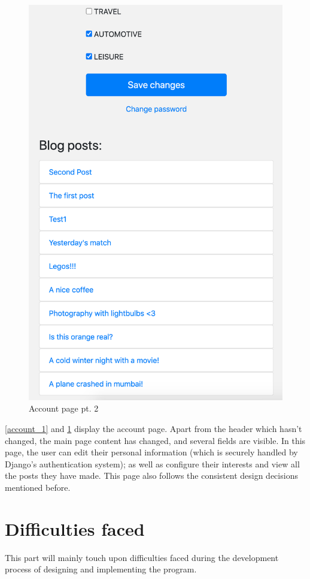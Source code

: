 \begin{figure}[htbp]
\begin{minipage}[t]{0.45\linewidth}
    \includegraphics[width=\linewidth]{Figures/account_2}
    \caption{Account page pt. 2}
    \label{account_2}
\end{minipage}
\end{figure}

\ref{account_1} and \ref{account_2} display the account page. Apart from the header which hasn't changed, the main page content has changed, and several fields are visible. In this page, the user can edit their personal information (which is securely handled by Django's authentication system); as well as configure their interests and view all the posts they have made. This page also follows the consistent design decisions mentioned before.

\section{Difficulties faced}
This part will mainly touch upon difficulties faced during the development process of designing and implementing the program.

